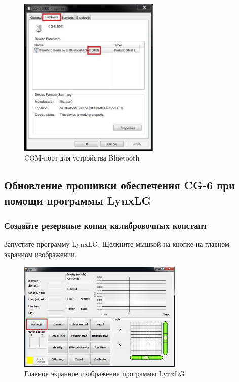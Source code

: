 \begin{figure}[H]
  \centering
  \includegraphics[width=0.6\textwidth]{figures/bluetooth_device_com_port}
  \caption{COM-порт для устройства Bluetooth}
  \label{fig:bluetooth_device_com_port}
\end{figure}

\subsection[Обновление прошивки при помощи LynxLG]{Обновление прошивки обеспечения CG-6 при помощи программы LynxLG}
\label{subsec:upgrading_cg6_firmware_with_lynxlg_software}


\subsubsection{Создайте резервные копии калибровочных констант}

Запустите программу LynxLG. Щёлкните мышкой на кнопке  на главном
экранном изображении.

\begin{figure}[H]
  \centering
  \includegraphics[width=0.7\textwidth]{figures/the_lynxlg_software_main_screen}
  \caption{Главное экранное изображение программы LynxLG}
  \label{fig:the_lynxlg_software_main_screen}
\end{figure}

